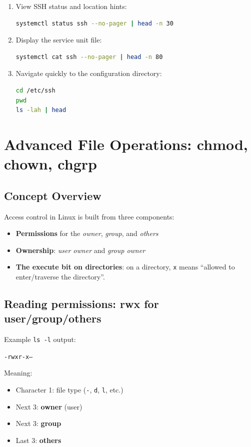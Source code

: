\begin{enumerate}
    \item View SSH status and location hints:
\begin{lstlisting}[language=bash, caption={Tracing service information via systemctl}]
systemctl status ssh --no-pager | head -n 30
\end{lstlisting}

    \item Display the service unit file:
\begin{lstlisting}[language=bash, caption={Finding the service unit file}]
systemctl cat ssh --no-pager | head -n 80
\end{lstlisting}

    \item Navigate quickly to the configuration directory:
\begin{lstlisting}[language=bash, caption={Navigating to the SSH configuration directory}]
cd /etc/ssh
pwd
ls -lah | head
\end{lstlisting}
\end{enumerate}

\section{Advanced File Operations: chmod, chown, chgrp}
\label{sec:perm-owner}

\subsection*{Concept Overview}
Access control in Linux is built from three components:
\begin{itemize}
    \item \textbf{Permissions} for the \textit{owner}, \textit{group}, and \textit{others}
    \item \textbf{Ownership}: \textit{user owner} and \textit{group owner}
    \item \textbf{The execute bit on directories}: on a directory, \texttt{x} means
          ``allowed to enter/traverse the directory''.
\end{itemize}

\subsection*{Reading permissions: rwx for user/group/others}
Example \texttt{ls -l} output:
\begin{center}
\texttt{-rwxr-x---}
\end{center}
Meaning:
\begin{itemize}
    \item Character 1: file type (\texttt{-}, \texttt{d}, \texttt{l}, etc.)
    \item Next 3: \textbf{owner} (user)
    \item Next 3: \textbf{group}
    \item Last 3: \textbf{others}
\end{itemize}

